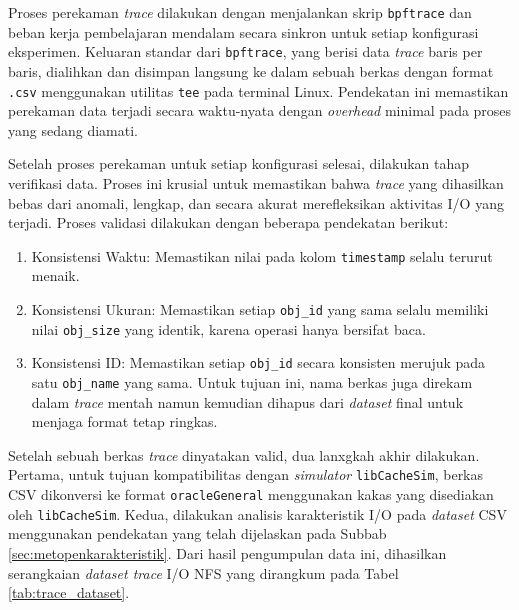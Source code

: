 Proses perekaman \textit{trace} dilakukan dengan menjalankan skrip \texttt{bpftrace} dan beban kerja pembelajaran mendalam secara sinkron untuk setiap konfigurasi eksperimen. Keluaran standar dari \texttt{bpftrace}, yang berisi data \textit{trace} baris per baris, dialihkan dan disimpan langsung ke dalam sebuah berkas dengan format \texttt{.csv} menggunakan utilitas \texttt{tee} pada terminal Linux. Pendekatan ini memastikan perekaman data terjadi secara waktu-nyata dengan \textit{overhead} minimal pada proses yang sedang diamati.

Setelah proses perekaman untuk setiap konfigurasi selesai, dilakukan tahap verifikasi data. Proses ini krusial untuk memastikan bahwa \textit{trace} yang dihasilkan bebas dari anomali, lengkap, dan secara akurat merefleksikan aktivitas I/O yang terjadi. Proses validasi dilakukan dengan beberapa pendekatan berikut:
\begin{enumerate}[itemsep=0pt, parsep=0pt]
    \item Konsistensi Waktu: Memastikan nilai pada kolom \texttt{timestamp} selalu terurut menaik.
    \item Konsistensi Ukuran: Memastikan setiap \texttt{obj\_id} yang sama selalu memiliki nilai \texttt{obj\_size} yang identik, karena operasi hanya bersifat baca.
    \item Konsistensi ID: Memastikan setiap \texttt{obj\_id} secara konsisten merujuk pada satu \texttt{obj\_name} yang sama. Untuk tujuan ini, nama berkas juga direkam dalam \textit{trace} mentah namun kemudian dihapus dari \textit{dataset} final untuk menjaga format tetap ringkas.
\end{enumerate}


Setelah sebuah berkas \textit{trace} dinyatakan valid, dua lanxgkah akhir dilakukan. Pertama, untuk tujuan kompatibilitas dengan \textit{simulator} \texttt{libCacheSim}, berkas CSV dikonversi ke format \texttt{oracleGeneral} menggunakan kakas yang disediakan oleh \texttt{libCacheSim}. Kedua, dilakukan analisis karakteristik I/O pada \textit{dataset} CSV menggunakan pendekatan yang telah dijelaskan pada Subbab \ref{sec:metopenkarakteristik}. Dari hasil pengumpulan data ini, dihasilkan serangkaian \textit{dataset trace} I/O NFS yang dirangkum pada Tabel \ref{tab:trace_dataset}.

